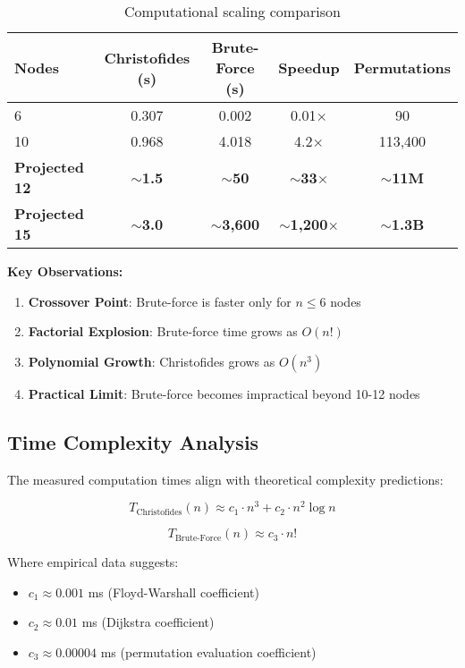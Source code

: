 \documentclass[9pt,a4paper,twoside]{tau}
\begin{document}
\begin{table}[h]
\centering
\begin{tabular}{@{}lcccc@{}}
\toprule
\textbf{Nodes} & \textbf{Christofides (s)} & \textbf{Brute-Force (s)} & \textbf{Speedup} & \textbf{Permutations} \\
\midrule
6 & 0.307 & 0.002 & 0.01$\times$ & 90 \\
10 & 0.968 & 4.018 & 4.2$\times$ & 113,400 \\
\midrule
\textbf{Projected 12} & \textbf{$\sim$1.5} & \textbf{$\sim$50} & \textbf{$\sim$33$\times$} & \textbf{$\sim$11M} \\
\textbf{Projected 15} & \textbf{$\sim$3.0} & \textbf{$\sim$3,600} & \textbf{$\sim$1,200$\times$} & \textbf{$\sim$1.3B} \\
\bottomrule
\end{tabular}
\caption{Computational scaling comparison}
\label{tab:scaling}
\end{table}

\textbf{Key Observations:}
\begin{enumerate}
    \item \textbf{Crossover Point}: Brute-force is faster only for $n \leq 6$ nodes
    \item \textbf{Factorial Explosion}: Brute-force time grows as $O(n!)$
    \item \textbf{Polynomial Growth}: Christofides grows as $O(n^3)$
    \item \textbf{Practical Limit}: Brute-force becomes impractical beyond 10-12 nodes
\end{enumerate}

\subsection{Time Complexity Analysis}

The measured computation times align with theoretical complexity predictions:

\begin{equation}
T_{\text{Christofides}}(n) \approx c_1 \cdot n^3 + c_2 \cdot n^2 \log n
\end{equation}

\begin{equation}
T_{\text{Brute-Force}}(n) \approx c_3 \cdot n!
\end{equation}

Where empirical data suggests:
\begin{itemize}
    \item $c_1 \approx 0.001$ ms (Floyd-Warshall coefficient)
    \item $c_2 \approx 0.01$ ms (Dijkstra coefficient)
    \item $c_3 \approx 0.00004$ ms (permutation evaluation coefficient)
\end{itemize}
\end{document}
